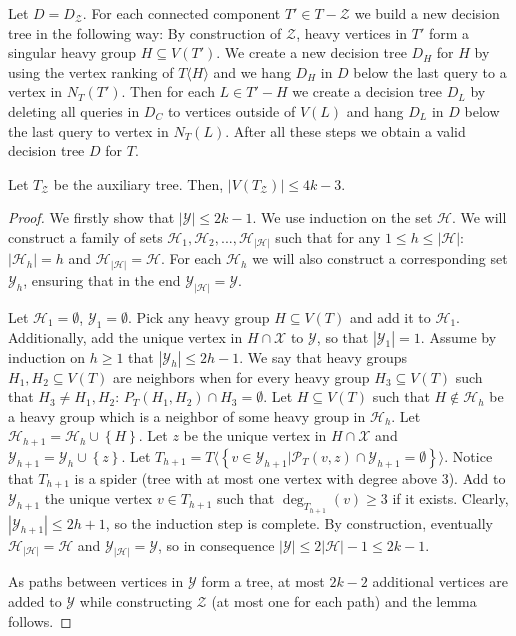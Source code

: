 \documentclass[a4paper, anonymous, numberwithinsect, pdfa, UKenglish,cleveref, autoref, thm-restate]{socg-lipics-v2021}
\newcommand{\br}[1]{\left( #1 \right)}
\newcommand{\brc}[1]{\left\{ #1 \right\}}
\newcommand{\spr}[1]{\left| #1 \right|}
\newcommand{\angl}[1]{\langle #1 \rangle}
\begin{document}
Let $D = D_{\mathcal{Z}}$. For each connected component $T'\in T-\mathcal{Z}$ we build a new decision tree in the following way: By construction of $\mathcal{Z}$, heavy vertices in $T'$ form a singular heavy group $H\subseteq V\br{T'}$. We create a new decision tree $D_H$ for $H$ by using the vertex ranking of $T\angl{H}$ and we hang $D_{H}$ in $D$ below the last query to a vertex in $N_T\br{T'}$. Then for each $L\in T'-H$ we create a decision tree $D_L$ by deleting all queries in $D_C$ to vertices outside of $V\br{L}$ and hang $D_L$ in $D$ below the last query to vertex in $N_T\br{L}$. After all these steps we obtain a valid decision tree $D$ for $T$.
\begin{lemma}\label{auxTreeSizeLemma}
    Let $T_{\mathcal{Z}}$ be the auxiliary tree. Then, $\spr{V\br{T_{\mathcal{Z}}}}\leq 4k-3$.
    \begin{proof}
        We firstly show that $\spr{\mathcal{Y}}\leq 2k-1$. We use induction on the set $\mathcal{H}$. We will construct a family of sets $\mathcal{H}_1, \mathcal{H}_2,..., \mathcal{H}_{\spr{\mathcal{H}}}$ such that for any $1\leq h\leq \spr{\mathcal{H}}$: $\spr{\mathcal{H}_h}=h$ and $\mathcal{H}_{\spr{\mathcal{H}}}=\mathcal{H}$. For each $\mathcal{H}_h$ we will also construct a corresponding set $\mathcal{Y}_h$, ensuring that in the end $\mathcal{Y}_{\spr{\mathcal{H}}}=\mathcal{Y}$.
        
        Let $\mathcal{H}_1=\emptyset$, $\mathcal{Y}_1=\emptyset$. Pick any heavy group $H\subseteq V\br{T}$ and add it to $\mathcal{H}_1$. Additionally, add the unique vertex in $H\cap\mathcal{X}$ to $\mathcal{Y}$, so that $\spr{\mathcal{Y}_1}=1$. Assume by induction on $h\geq1$ that $\spr{\mathcal{Y}_h}\leq 2h-1$. We say that heavy groups $H_1,H_2\subseteq V\br{T}$ are neighbors when for every heavy group $H_3\subseteq V\br{T}$ such that $H_3\neq H_1,H_2$: $P_T\br{H_1,H_2}\cap H_3=\emptyset$.
        Let $H\subseteq V\br{T}$ such that $H\notin \mathcal{H}_h$ be a heavy group which is a neighbor of some heavy group in $\mathcal{H}_h$. Let $\mathcal{H}_{h+1}=\mathcal{H}_h\cup\brc{H}$.  Let $z$ be the unique vertex in $H\cap\mathcal{X}$ and $\mathcal{Y}_{h+1}=\mathcal{Y}_{h}\cup\brc{z}$. Let $T_{h+1}=T\angl{\brc{v\in \mathcal{Y}_{h+1}|\mathcal{P}_T\br{v,z}\cap \mathcal{Y}_{h+1}=\emptyset}}$. Notice that $T_{h+1}$ is a spider (tree with at most one vertex with degree above 3). Add to $\mathcal{Y}_{h+1}$ the unique vertex $v\in T_{h+1}$ such that $\deg_{T_{h+1}}\br{v}\geq 3$ if it exists. Clearly, $\spr{\mathcal{Y}_{h+1}}\leq2h+1$, so the induction step is complete. By construction, eventually $\mathcal{H}_{\spr{\mathcal{H}}}=\mathcal{H}$ and $\mathcal{Y}_{\spr{\mathcal{H}}}=\mathcal{Y}$, so in consequence $\spr{\mathcal{Y}}\leq 2\spr{\mathcal{H}}-1\leq 2k-1$.
        
        As paths between vertices in $\mathcal{Y}$ form a tree, at most $2k-2$ additional vertices are added to $\mathcal{Y}$ while constructing $\mathcal{Z}$ (at most one for each path) and the lemma follows.
    \end{proof}
\end{lemma}
\end{document}
